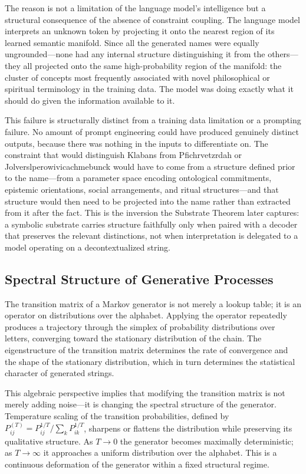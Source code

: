 \documentclass[12pt, a4paper]{article}
\theoremstyle{plain}
\theoremstyle{definition}
\theoremstyle{remark}
\begin{document}
The reason is not a limitation of the language model's intelligence but a structural consequence of the absence of constraint coupling. The language model interprets an unknown token by projecting it onto the nearest region of its learned semantic manifold. Since all the generated names were equally ungrounded---none had any internal structure distinguishing it from the others---they all projected onto the same high-probability region of the manifold: the cluster of concepts most frequently associated with novel philosophical or spiritual terminology in the training data. The model was doing exactly what it should do given the information available to it.

This failure is structurally distinct from a training data limitation or a prompting failure. No amount of prompt engineering could have produced genuinely distinct outputs, because there was nothing in the inputs to differentiate on. The constraint that would distinguish Klabans from Pfichrvetzrdah or Jolverslperowivicachmebunck would have to come from a structure defined prior to the name---from a parameter space encoding ontological commitments, epistemic orientations, social arrangements, and ritual structures---and that structure would then need to be projected into the name rather than extracted from it after the fact. This is the inversion the Substrate Theorem later captures: a symbolic substrate carries structure faithfully only when paired with a decoder that preserves the relevant distinctions, not when interpretation is delegated to a model operating on a decontextualized string.

\subsection{Spectral Structure of Generative Processes}

The transition matrix of a Markov generator is not merely a lookup table; it is an operator on distributions over the alphabet. Applying the operator repeatedly produces a trajectory through the simplex of probability distributions over letters, converging toward the stationary distribution of the chain. The eigenstructure of the transition matrix determines the rate of convergence and the shape of the stationary distribution, which in turn determines the statistical character of generated strings.

This algebraic perspective implies that modifying the transition matrix is not merely adding noise---it is changing the spectral structure of the generator. Temperature scaling of the transition probabilities, defined by $P_{ij}^{(T)} = P_{ij}^{1/T} / \sum_k P_{ik}^{1/T}$, sharpens or flattens the distribution while preserving its qualitative structure. As $T \to 0$ the generator becomes maximally deterministic; as $T \to \infty$ it approaches a uniform distribution over the alphabet. This is a continuous deformation of the generator within a fixed structural regime.
\end{document}
